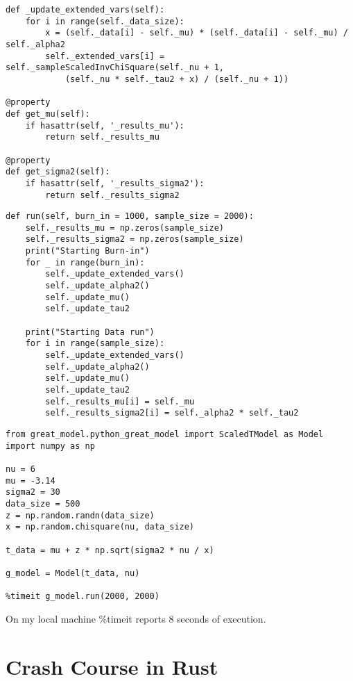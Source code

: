\documentclass[8pt]{beamer}
\begin{document}
\begin{frame}[fragile]
\begin{verbatim}
def _update_extended_vars(self):
	for i in range(self._data_size):
		x = (self._data[i] - self._mu) * (self._data[i] - self._mu) / self._alpha2
		self._extended_vars[i] = self._sampleScaledInvChiSquare(self._nu + 1, 
			(self._nu * self._tau2 + x) / (self._nu + 1))

@property
def get_mu(self):
	if hasattr(self, '_results_mu'):
		return self._results_mu

@property
def get_sigma2(self):
	if hasattr(self, '_results_sigma2'):
		return self._results_sigma2
\end{verbatim}
\end{frame}

\begin{frame}[fragile]
\begin{verbatim}
def run(self, burn_in = 1000, sample_size = 2000):
	self._results_mu = np.zeros(sample_size)
	self._results_sigma2 = np.zeros(sample_size)
	print("Starting Burn-in")
	for _ in range(burn_in):
		self._update_extended_vars()
		self._update_alpha2()
		self._update_mu()
		self._update_tau2

	print("Starting Data run")
	for i in range(sample_size):
		self._update_extended_vars()
		self._update_alpha2()
		self._update_mu()
		self._update_tau2
		self._results_mu[i] = self._mu
		self._results_sigma2[i] = self._alpha2 * self._tau2
\end{verbatim}
\end{frame}

\begin{frame}[fragile]
\begin{verbatim}
from great_model.python_great_model import ScaledTModel as Model
import numpy as np

nu = 6
mu = -3.14
sigma2 = 30
data_size = 500
z = np.random.randn(data_size)
x = np.random.chisquare(nu, data_size)

t_data = mu + z * np.sqrt(sigma2 * nu / x)

g_model = Model(t_data, nu)

%timeit g_model.run(2000, 2000)
\end{verbatim}

On my local machine \%timeit reports 8 seconds of execution.  
\end{frame}

\section{Crash Course in Rust}
\end{document}
